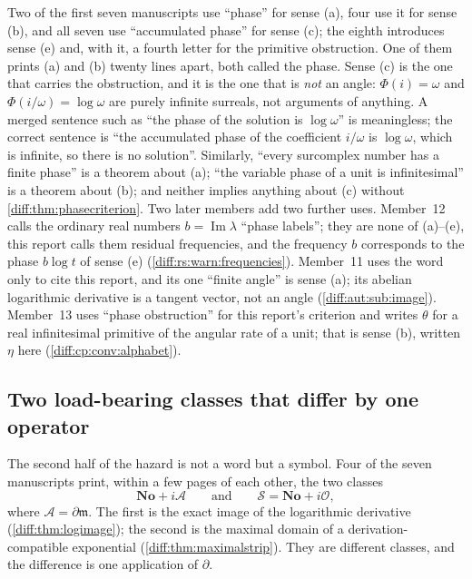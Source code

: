 \documentclass[11pt,letterpaper]{article}
\numberwithin{equation}{section}
\theoremstyle{definition}
\theoremstyle{remark}
\newcommand{\No}{\mathbf{No}}
\newcommand{\der}{\partial}
\newcommand{\Ofin}{\mathcal O}
\newcommand{\mm}{\mathfrak m}
\newcommand{\Acl}{\mathcal A}
\newcommand{\Imm}{\operatorname{Im}}
\newcommand{\Strip}{\mathcal S}
\begin{document}
\begin{warning}
\label{diff:warn:phasecollision}
Two of the first seven manuscripts use ``phase'' for sense (a), four use it for
sense (b), and all seven use ``accumulated phase'' for sense (c); the eighth
introduces sense (e) and, with it, a fourth letter for the primitive
obstruction. One of them prints
(a) and (b) twenty lines apart, both called the phase. Sense (c) is the one
that carries the obstruction, and it is the one that is \emph{not} an angle:
$\Phi(i)=\omega$ and $\Phi(i/\omega)=\log\omega$ are purely infinite surreals,
not arguments of anything. A merged sentence such as ``the phase of the
solution is $\log\omega$'' is meaningless; the correct sentence is ``the
accumulated phase of the coefficient $i/\omega$ is $\log\omega$, which is
infinite, so there is no solution''. Similarly, ``every surcomplex number has
a finite phase'' is a theorem about (a); ``the variable phase of a unit is
infinitesimal'' is a theorem about (b); and neither implies anything about (c)
without \cref{diff:thm:phasecriterion}. Two later members add two further uses.
Member~12 calls the ordinary real numbers $b=\Imm\lambda$ ``phase labels''; they
are none of (a)--(e), this report calls them residual frequencies, and the
frequency $b$ corresponds to the phase $b\log t$ of sense (e)
(\cref{diff:rs:warn:frequencies}). Member~11 uses the word only to cite this
report, and its one ``finite angle'' is sense (a); its abelian logarithmic
derivative is a tangent vector, not an angle (\cref{diff:aut:sub:image}).
Member~13 uses ``phase obstruction'' for this report's criterion and writes
$\theta$ for a real infinitesimal primitive of the angular rate of a unit; that
is sense (b), written $\eta$ here (\cref{diff:cp:conv:alphabet}).
\end{warning}

\subsection{Two load-bearing classes that differ by one operator}
\label{diff:sub:twoclasses}

The second half of the hazard is not a word but a symbol. Four of the seven
manuscripts print, within a few pages of each other, the two classes
\[
 \No+i\Acl \qquad\text{and}\qquad \Strip=\No+i\Ofin,
\]
where $\Acl=\der\mm$. The first is the exact image of the logarithmic
derivative (\cref{diff:thm:logimage}); the second is the maximal domain of a
derivation-compatible exponential (\cref{diff:thm:maximalstrip}). They are
different classes, and the difference is one application of $\der$.
\end{document}
